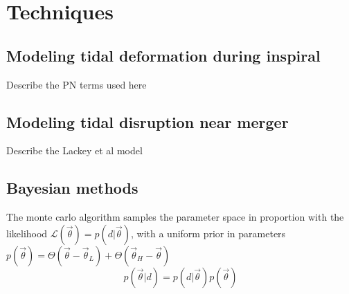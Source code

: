 \documentclass[aps,prd,amsmath,floats,floatfix, twocolumn,
superscriptaddress,nofootinbib,showpacs]{revtex4-1}
\newcommand{\LL}{\mathcal{L}}
\begin{document}
\section{Techniques}
\subsection{Modeling tidal deformation during inspiral}
Describe the PN terms used here

\subsection{Modeling tidal disruption near merger}
Describe the Lackey et al model

\subsection{Bayesian methods}

The monte carlo algorithm samples the parameter space in proportion with 
the likelihood $\LL(\vec{\theta}) = p(d|\vec{\theta})$, with a 
uniform prior in parameters $p(\vec{\theta}) = \Theta(\vec{\theta}-\vec{\theta}_L) + \Theta(\vec{\theta}_H-\vec{\theta})$
\begin{equation}
 p(\vec{\theta}|d) = p(d|\vec{\theta}) p(\vec{\theta})
\end{equation}
\end{document}

